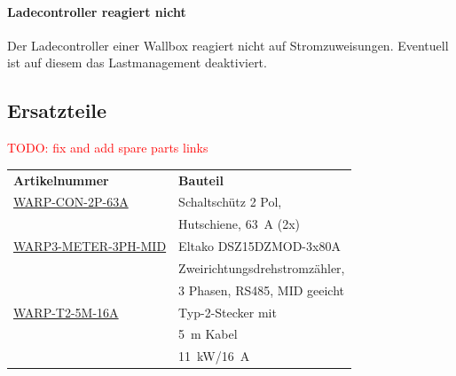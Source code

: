 \documentclass[a4paper,10pt]{article}
\newcommand\todo[1]{\textcolor{red}{\huge TODO: #1}}
\begin{document}
\begin{multicols*}{2}
    \paragraph{Ladecontroller reagiert nicht}
    Der Ladecontroller einer Wallbox reagiert nicht auf Stromzuweisungen. Eventuell ist auf diesem das Lastmanagement deaktiviert.

    \subsection{Ersatzteile}
	\todo{fix and add spare parts links}
	\par
    \begin{tabular}{ll}
        \toprule
        \textbf{Artikelnummer}                                                                                                      & \textbf{Bauteil}                     \\
        \cmidrule(lr{0.5em}){1-2}
        \href{https://www.tinkerforge.com/de/shop/warp/warp3-spare-parts/contactor-2-pole-din-rail-63a.html}{WARP-CON-2P-63A}		& Schaltschütz 2 Pol,                  \\
                                                                                                                                    & Hutschiene, \SI{63}{\ampere} (2x)\\
        \cmidrule(lr{0.5em}){1-2}
        \href{https://www.tinkerforge.com/de/shop/warp/warp3-spare-parts/contactor-4-pole-din-rail-63a.html}{WARP3-METER-3PH-MID}	& Eltako DSZ15DZMOD-3x80A               \\
                                                                                                                                    & Zweirichtungsdrehstromzähler,                     \\
                                                                                                                                    & 3	Phasen, RS485, MID geeicht\\
        \cmidrule(lr{0.5em}){1-2}
        \href{https://www.tinkerforge.com/de/shop/warp/warp3-spare-parts/type-2-plug-with-5m-cable-11kw-16a.html}{WARP-T2-5M-16A}   & Typ-2-Stecker mit                    \\
                                                                                                                                    & \SI{5}{\meter} Kabel                 \\
                                                                                                                                    & \SI{11}{\kilo\watt}/\SI{16}{\ampere} \\

\end{tabular}
\end{multicols*}
\end{document}
